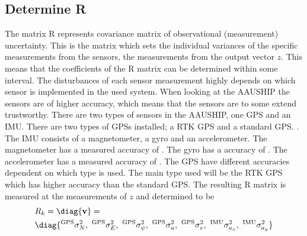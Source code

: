 \subsection{Determine R}
The matrix R represents covariance matrix of observational (measurement) uncertainty. This is the matrix which sets the individual variances of the specific measurements from the sensors, the measurements from the output vector $z$. This means that the coefficients of the R matrix can be determined within some interval. The disturbances of each sensor measurement highly depends on which sensor is implemented in the used system. When looking at the AAUSHIP the sensors are of higher accuracy, which means that the sensors are to some extend trustworthy. There are two types of sensors in the AAUSHIP, one \ac{GPS} and an \ac{IMU}. There are two types of \ac{GPS}s installed; a \ac{RTK} \ac{GPS} and a standard \ac{GPS}. . The \ac{IMU} consists of a magnetometer, a gyro and an accelerometer. The magnetometer has a measured accuracy of . The gyro has a accuracy of . The accelerometer has a measured accuracy of . The \ac{GPS} have different accuracies dependent on which type is used. The main type used will be the \ac{RTK} \ac{GPS} which has higher accuracy than the standard \ac{GPS}. The resulting R matrix is measured at the measurements of $z$ and determined to be
\begin{align}
&R_k = \diag{\mathbf{v}} =\\ \nonumber
&\diag{^\text{GPS}\sigma_{N}^2,\ ^\text{GPS}\sigma_{E}^2,\ ^\text{GPS}\sigma_{\psi}^2,\ ^\text{GPS}\sigma_{u}^2,\ ^\text{GPS}\sigma_{v}^2,\ ^\text{IMU}\sigma_{a_x}^2,\ ^\text{IMU}\sigma_{a_y}^2}
\end{align}


